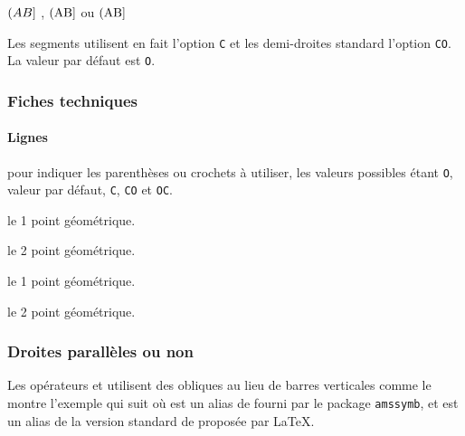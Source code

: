 \documentclass[12pt,a4paper]{article}
\begin{document}
\begin{latexex}
$\gline[OC]{A}{B}$ ,
$\gline[OC]{\pt{A}}{\pt{B}}$ ou
$\pgline[OC]{A}{B}$
\end{latexex}


\begin{remark}
	Les segments utilisent en fait l'option \verb+C+ et les demi-droites standard l'option \verb+CO+.
	La valeur par défaut est \verb+O+.
\end{remark}




\subsubsection{Fiches techniques}

\paragraph{Lignes}



\IDoption{} pour indiquer les parenthèses ou crochets à utiliser, les valeurs possibles étant \verb+O+, valeur par défaut, \verb+C+, \verb+CO+ et \verb+OC+.

 le 1\ier{} point géométrique.

 le 2\ieme{} point géométrique.


\separation




\extraspace



 le 1\ier{} point géométrique.

 le 2\ieme{} point géométrique.




\subsubsection{Droites parallèles ou non}

Les opérateurs  et  utilisent des obliques au lieu de barres verticales comme le montre l'exemple qui suit où  est un alias de  fourni par le package \verb+amssymb+, et  est un alias de la version standard de  proposée par \LaTeX{}.
\end{document}
